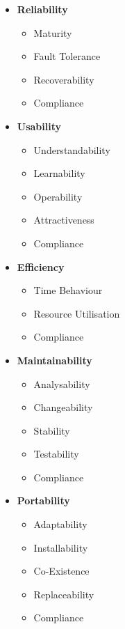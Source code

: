 {\begin{multicols}{3}
\begin{itemize}
					\item \textbf{Reliability}
						\begin{itemize}
							\item Maturity
							\item Fault Tolerance
							\item Recoverability 
							\item Compliance
						\end{itemize}	
						
					\columnbreak
						
					\item \textbf{Usability}
						\begin{itemize}
							\item Understandability
							\item Learnability
							\item Operability 
							\item Attractiveness
							\item Compliance
						\end{itemize}	
						
					\item \textbf{Efficiency}
						\begin{itemize}
							\item Time Behaviour
							\item Resource Utilisation
							\item Compliance 
						\end{itemize}	
					
					\columnbreak
						
					\item \textbf{Maintainability}
						\begin{itemize}
							\item Analysability
							\item Changeability
							\item Stability 
							\item Testability
							\item Compliance
						\end{itemize}	
						
					\item \textbf{Portability}
						\begin{itemize}
							\item Adaptability
							\item Installability
							\item Co-Existence 
							\item Replaceability
							\item Compliance
						\end{itemize}	
						
				\end{itemize}	
				
			\end{multicols}
	}	

